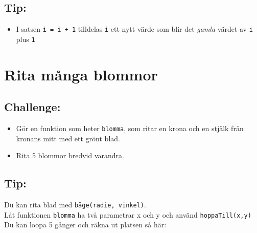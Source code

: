 \section*{\color{OliveGreen}Tip:}


\begin{itemize}

\item {I satsen \lstinline{i = i + 1} tilldelas \lstinline{i} ett nytt värde som blir det {\it gamla} värdet av \lstinline{i} plus \lstinline{1}}

\end{itemize}


\chapter{Rita många blommor}\section*{\color{BrickRed}Challenge:}


\begin{itemize}

\item {Gör en funktion som heter \lstinline{blomma}, som ritar en krona och en stjälk från kronans mitt med ett grönt blad.}
\item {Rita 5 blommor bredvid varandra.}

\end{itemize}



  
\section*{\color{OliveGreen}Tip:}
Du kan rita blad med \lstinline{båge(radie, vinkel)}. \\
Låt funktionen \lstinline{blomma} ha två parametrar x och y och använd \lstinline{hoppaTill(x,y)}\\
Du kan loopa 5 gånger och räkna ut platsen så här:

